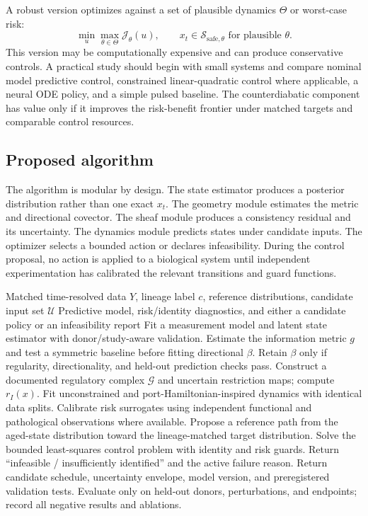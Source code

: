 \documentclass[11pt,a4paper]{article}
\theoremstyle{definition}
\theoremstyle{remark}
\newcommand{\G}{\mathcal{G}}
\begin{document}
A robust version optimizes against a set of plausible dynamics $\Theta$ or worst-case risk:
\begin{equation}
\min_u\max_{\theta\in\Theta}\mathcal{J}_{\theta}(u),\qquad x_t\in\mathcal{S}_{\mathrm{safe},\theta}\text{ for plausible }\theta.
\end{equation}
This version may be computationally expensive and can produce conservative controls. A practical study should begin with small systems and compare nominal model predictive control, constrained linear-quadratic control where applicable, a neural ODE policy, and a simple pulsed baseline. The counterdiabatic component has value only if it improves the risk-benefit frontier under matched targets and comparable control resources.

\subsection{Proposed algorithm}
The algorithm is modular by design. The state estimator produces a posterior distribution rather than one exact $x_t$. The geometry module estimates the metric and directional covector. The sheaf module produces a consistency residual and its uncertainty. The dynamics module predicts states under candidate inputs. The optimizer selects a bounded action or declares infeasibility. During the control proposal, no action is applied to a biological system until independent experimentation has calibrated the relevant transitions and guard functions.

\begin{algorithm}[htbp]
\caption{CST inference and candidate-control loop (research blueprint)}
\begin{algorithmic}[1]
\Require Matched time-resolved data $Y$, lineage label $c$, reference distributions, candidate input set $\mathcal{U}$
\Ensure Predictive model, risk/identity diagnostics, and either a candidate policy or an infeasibility report
\State Fit a measurement model and latent state estimator with donor/study-aware validation.
\State Estimate the information metric $g$ and test a symmetric baseline before fitting directional $\beta$.
\State Retain $\beta$ only if regularity, directionality, and held-out prediction checks pass.
\State Construct a documented regulatory complex $\G$ and uncertain restriction maps; compute $r_I(x)$.
\State Fit unconstrained and port-Hamiltonian-inspired dynamics with identical data splits.
\State Calibrate risk surrogates using independent functional and pathological observations where available.
\State Propose a reference path from the aged-state distribution toward the lineage-matched target distribution.
\State Solve the bounded least-squares control problem with identity and risk guards.
  \State Return ``infeasible / insufficiently identified'' and the active failure reason.
\Else
  \State Return candidate schedule, uncertainty envelope, model version, and preregistered validation tests.
\EndIf
\State Evaluate only on held-out donors, perturbations, and endpoints; record all negative results and ablations.
\end{algorithmic}
\end{algorithm}
\end{document}
